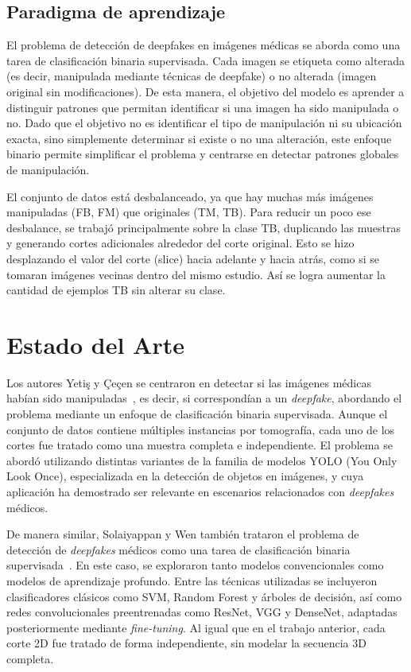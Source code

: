 \documentclass[conference]{IEEEtran}
\begin{document}
\subsection{Paradigma de aprendizaje}

El problema de detección de deepfakes en imágenes médicas se aborda como una tarea de clasificación binaria supervisada. Cada imagen se etiqueta como alterada (es decir, manipulada mediante técnicas de deepfake) o no alterada (imagen original sin modificaciones). De esta manera, el objetivo del modelo es aprender a distinguir patrones que permitan identificar si una imagen ha sido manipulada o no.
Dado que el objetivo no es identificar el tipo de manipulación ni su ubicación exacta, sino simplemente determinar si existe o no una alteración, este enfoque binario permite simplificar el problema y centrarse en detectar patrones globales de manipulación.

El conjunto de datos está desbalanceado, ya que hay muchas más imágenes manipuladas (FB, FM) que originales (TM, TB). Para reducir un poco ese desbalance, se trabajó principalmente sobre la clase TB, duplicando las muestras y generando cortes adicionales alrededor del corte original. Esto se hizo desplazando el valor del corte (slice) hacia adelante y hacia atrás, como si se tomaran imágenes vecinas dentro del mismo estudio. Así se logra aumentar la cantidad de ejemplos TB sin alterar su clase.


\section{Estado del Arte}

Los autores Yetiş y Çeçen se centraron en detectar si las imágenes médicas habían sido manipuladas~\cite{yetis2024}, es decir, si correspondían a un \textit{deepfake}, abordando el problema mediante un enfoque de clasificación binaria supervisada. Aunque el conjunto de datos contiene múltiples instancias por tomografía, cada uno de los cortes fue tratado como una muestra completa e independiente. El problema se abordó utilizando distintas variantes de la familia de modelos YOLO (You Only Look Once), especializada en la detección de objetos en imágenes, y cuya aplicación ha demostrado ser relevante en escenarios relacionados con \textit{deepfakes} médicos.

De manera similar, Solaiyappan y Wen también trataron el problema de detección de \textit{deepfakes} médicos como una tarea de clasificación binaria supervisada~\cite{solaiyappan2022}. En este caso, se exploraron tanto modelos convencionales como modelos de aprendizaje profundo. Entre las técnicas utilizadas se incluyeron clasificadores clásicos como SVM, Random Forest y árboles de decisión, así como redes convolucionales preentrenadas como ResNet, VGG y DenseNet, adaptadas posteriormente mediante \textit{fine-tuning}. Al igual que en el trabajo anterior, cada corte 2D fue tratado de forma independiente, sin modelar la secuencia 3D completa.
\end{document}
